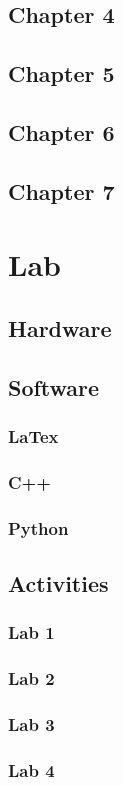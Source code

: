 \documentclass[journal]{IEEEtran}
\begin{document}
\subsection{Chapter 4}
\subsection{Chapter 5}
\subsection{Chapter 6}
\subsection{Chapter 7}

\section{Lab}
\subsection{Hardware}
\subsection{Software}
\subsubsection{LaTex}
\subsubsection{C++}
\subsubsection{Python}
\subsection{Activities}
\subsubsection{Lab 1}
\subsubsection{Lab 2}
\subsubsection{Lab 3}
\subsubsection{Lab 4}
\end{document}

